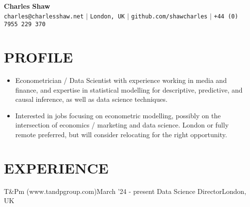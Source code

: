 \documentclass[letterpaper,11pt]{article}
\begin{document}
\begin{center}
    \textbf{\Huge Charles Shaw} \\ \vspace{15pt}
\small 
\hspace{1pt} \faEnvelope \hspace{1pt} \texttt{charles@charlesshaw.net} \hspace{1pt} $|$
\hspace{1pt} \faMapMarker* \hspace{1pt}\texttt{London, UK}  \hspace{1pt} $|$
\hspace{1pt} \faGithub \hspace{1pt} \texttt{github.com/shawcharles} \hspace{1pt} $|$
\hspace{1pt} \faPhone \hspace{1pt} \texttt{+44 (0) 7955 229 370} \hspace{1pt}
\end{center}

\section{PROFILE}

\begin{itemize}
\item Econometrician / Data Scientist with experience working in media and finance, and expertise in statistical modelling for descriptive, predictive, and causal inference, as well as data science techniques.
\item Interested in jobs focusing on econometric modelling, possibly on the intersection of economics / marketing and data science. London or fully remote preferred, but will consider relocating for the right opportunity. 

\end{itemize}
     
\section{EXPERIENCE}
\resumeSubHeadingListStart

\resumeSubheading
{T\&Pm (www.tandpgroup.com)}{March '24 - present}
{Data Science Director}{London, UK}
\resumeItemListStart
{}
\resumeItemListEnd
\end{document}
